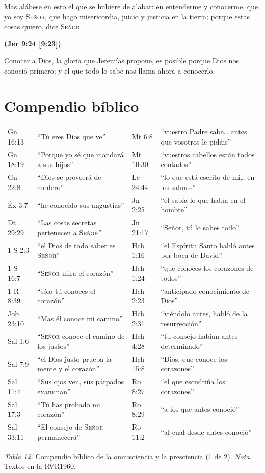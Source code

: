 \documentclass[11pt,letterpaper]{article}
\newcommand{\SENOR}{\textsc{Señor}}
\newcommand{\fuente}[1]{\par\hfill{\upshape\bfseries\small\textcolor{azul}{#1}}}
\begin{document}
\begin{cita}Mas alábese en esto el que se hubiere de alabar: en entenderme y conocerme, que yo soy \SENOR{}, que hago misericordia, juicio y justicia en la tierra; porque estas cosas quiero, dice \SENOR{}.\fuente{(Jer 9:24 [9:23])}\end{cita}

Conocer a Dios, la gloria que Jeremías propone, es posible porque Dios nos conoció primero; y el que todo lo sabe nos llama ahora a conocerlo.

\section*{Compendio bíblico}
\begin{center}\small\renewcommand{\arraystretch}{1.12}
\begin{tabular}{@{}L{2.2cm}L{5.0cm}|L{2.2cm}L{5.0cm}@{}}
\toprule
Gn 16:13 & ``Tú eres Dios que ve'' & Mt 6:8 & ``vuestro Padre sabe\ldots{} antes que vosotros le pidáis'' \\
Gn 18:19 & ``Porque yo sé que mandará a sus hijos'' & Mt 10:30 & ``vuestros cabellos están todos contados'' \\
Gn 22:8 & ``Dios se proveerá de cordero'' & Lc 24:44 & ``lo que está escrito de mí\ldots{} en los salmos'' \\
Éx 3:7 & ``he conocido sus angustias'' & Jn 2:25 & ``él sabía lo que había en el hombre'' \\
Dt 29:29 & ``Las cosas secretas pertenecen a \SENOR{}'' & Jn 21:17 & ``Señor, tú lo sabes todo'' \\
1 S 2:3 & ``el Dios de todo saber es \SENOR{}'' & Hch 1:16 & ``el Espíritu Santo habló antes por boca de David'' \\
1 S 16:7 & ``\SENOR{} mira el corazón'' & Hch 1:24 & ``que conoces los corazones de todos'' \\
1 R 8:39 & ``sólo tú conoces el corazón'' & Hch 2:23 & ``anticipado conocimiento de Dios'' \\
Job 23:10 & ``Mas él conoce mi camino'' & Hch 2:31 & ``viéndolo antes, habló de la resurrección'' \\
Sal 1:6 & ``\SENOR{} conoce el camino de los justos'' & Hch 4:28 & ``tu consejo habían antes determinado'' \\
Sal 7:9 & ``el Dios justo prueba la mente y el corazón'' & Hch 15:8 & ``Dios, que conoce los corazones'' \\
Sal 11:4 & ``Sus ojos ven, sus párpados examinan'' & Ro 8:27 & ``el que escudriña los corazones'' \\
Sal 17:3 & ``Tú has probado mi corazón'' & Ro 8:29 & ``a los que antes conoció'' \\
Sal 33:11 & ``El consejo de \SENOR{} permanecerá'' & Ro 11:2 & ``al cual desde antes conoció'' \\
\bottomrule
\end{tabular}\par
{\footnotesize\color{gris}\textit{Tabla 12.} Compendio bíblico de la omnisciencia y la presciencia (1 de 2). \textit{Nota.} Textos en la RVR1960.}
\end{center}
\end{document}
